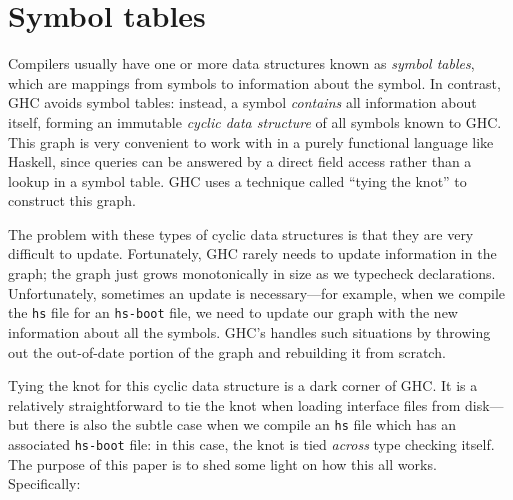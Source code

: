 \chapter{Symbol tables}

Compilers usually have one or more data structures known as
\emph{symbol tables}, which are mappings from symbols to information
about the symbol.  In contrast, GHC avoids symbol tables:  instead, a
symbol \emph{contains} all information about itself, forming an
immutable \emph{cyclic data structure} of all symbols
known to GHC\@.  This graph is very convenient to work
with in a purely functional language like Haskell, since queries can
be answered by a direct field access rather than a lookup in
a symbol table.  GHC uses a technique called ``tying the knot''
to construct this graph.

The problem with these types of cyclic data structures is that
they are very difficult to update.  Fortunately, GHC rarely
needs to update information in the graph; the graph just grows
monotonically in size as we typecheck declarations.
Unfortunately, sometimes an update is necessary---for example, when
we compile the \verb|hs| file for an \verb|hs-boot| file, we
need to update our graph with the new information about all the
symbols.  GHC's handles such situations by throwing out the out-of-date
portion of the graph and rebuilding it from scratch.

Tying the knot for this cyclic data structure is a dark corner of GHC\@.
It is a relatively straightforward to tie the knot when loading
interface files from disk---but there is also the subtle case when we
compile an \verb|hs| file which has an associated \verb|hs-boot| file:
in this case, the knot is tied \emph{across} type checking itself.
The purpose of this paper is to shed some light on how this all works.
Specifically:

